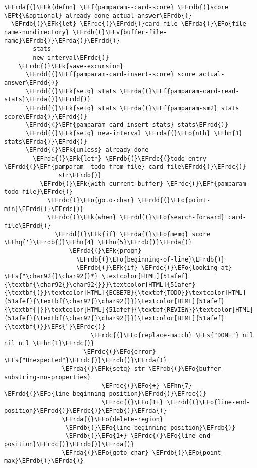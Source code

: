 \documentclass[a4wide,10pt]{article}
\newcommand{\EFs}[1]{\textcolor{EFs}{#1}} %
\newcommand{\EFk}[1]{\textcolor{EFk}{#1}} %
\newcommand{\EFf}[1]{\textcolor{EFf}{#1}} %
\newcommand{\EFv}[1]{\textcolor{EFv}{#1}} %
\newcommand{\EFt}[1]{\textcolor{EFt}{#1}} %
\newcommand{\EFo}[1]{\textcolor{EFo}{#1}} %
\newcommand{\EFhn}[1]{\textcolor{EFhn}{\textbf{#1}}} %
\newcommand{\EFhq}[1]{\textcolor{EFhq}{#1}} %
\newcommand{\EFrda}[1]{\textcolor{EFrda}{#1}} %
\newcommand{\EFrdb}[1]{\textcolor{EFrdb}{#1}} %
\newcommand{\EFrdc}[1]{\textcolor{EFrdc}{#1}} %
\newcommand{\EFrdd}[1]{\textcolor{EFrdd}{#1}} %
\begin{document}
\begin{Code}
\begin{Verbatim}
\EFrda{(}\EFk{defun} \EFf{pamparam--card-score} \EFrdb{(}score \EFt{\&optional} already-done actual-answer\EFrdb{)}
  \EFrdb{(}\EFk{let} \EFrdc{(}\EFrdd{(}card-file \EFrda{(}\EFo{file-name-nondirectory} \EFrdb{(}\EFv{buffer-file-name}\EFrdb{)}\EFrda{)}\EFrdd{)}
        stats
        new-interval\EFrdc{)}
    \EFrdc{(}\EFk{save-excursion}
      \EFrdd{(}\EFf{pamparam-card-insert-score} score actual-answer\EFrdd{)}
      \EFrdd{(}\EFk{setq} stats \EFrda{(}\EFf{pamparam-card-read-stats}\EFrda{)}\EFrdd{)}
      \EFrdd{(}\EFk{setq} stats \EFrda{(}\EFf{pamparam-sm2} stats score\EFrda{)}\EFrdd{)}
      \EFrdd{(}\EFf{pamparam-card-insert-stats} stats\EFrdd{)}
      \EFrdd{(}\EFk{setq} new-interval \EFrda{(}\EFo{nth} \EFhn{1} stats\EFrda{)}\EFrdd{)}
      \EFrdd{(}\EFk{unless} already-done
        \EFrda{(}\EFk{let*} \EFrdb{(}\EFrdc{(}todo-entry \EFrdd{(}\EFf{pamparam--todo-from-file} card-file\EFrdd{)}\EFrdc{)}
               str\EFrdb{)}
          \EFrdb{(}\EFk{with-current-buffer} \EFrdc{(}\EFf{pamparam-todo-file}\EFrdc{)}
            \EFrdc{(}\EFo{goto-char} \EFrdd{(}\EFo{point-min}\EFrdd{)}\EFrdc{)}
            \EFrdc{(}\EFk{when} \EFrdd{(}\EFo{search-forward} card-file\EFrdd{)}
              \EFrdd{(}\EFk{if} \EFrda{(}\EFo{memq} score \EFhq{'}\EFrdb{(}\EFhn{4} \EFhn{5}\EFrdb{)}\EFrda{)}
                  \EFrda{(}\EFk{progn}
                    \EFrdb{(}\EFo{beginning-of-line}\EFrdb{)}
                    \EFrdb{(}\EFk{if} \EFrdc{(}\EFo{looking-at} \EFs{"\char92{}\char92{}*} \textcolor[HTML]{51afef}{\textbf{\char92{}\char92{}}}\textcolor[HTML]{51afef}{\textbf{(}}\textcolor[HTML]{ECBE7B}{\textbf{TODO}}\textcolor[HTML]{51afef}{\textbf{\char92{}\char92{}}}\textcolor[HTML]{51afef}{\textbf{|}}\textcolor[HTML]{51afef}{\textbf{REVIEW}}\textcolor[HTML]{51afef}{\textbf{\char92{}\char92{}}}\textcolor[HTML]{51afef}{\textbf{)}}\EFs{"}\EFrdc{)}
                        \EFrdc{(}\EFo{replace-match} \EFs{"DONE"} nil nil nil \EFhn{1}\EFrdc{)}
                      \EFrdc{(}\EFo{error} \EFs{"Unexpected"}\EFrdc{)}\EFrdb{)}\EFrda{)}
                \EFrda{(}\EFk{setq} str \EFrdb{(}\EFo{buffer-substring-no-properties}
                           \EFrdc{(}\EFo{+} \EFhn{7} \EFrdd{(}\EFo{line-beginning-position}\EFrdd{)}\EFrdc{)}
                           \EFrdc{(}\EFo{1+} \EFrdd{(}\EFo{line-end-position}\EFrdd{)}\EFrdc{)}\EFrdb{)}\EFrda{)}
                \EFrda{(}\EFo{delete-region}
                 \EFrdb{(}\EFo{line-beginning-position}\EFrdb{)}
                 \EFrdb{(}\EFo{1+} \EFrdc{(}\EFo{line-end-position}\EFrdc{)}\EFrdb{)}\EFrda{)}
                \EFrda{(}\EFo{goto-char} \EFrdb{(}\EFo{point-max}\EFrdb{)}\EFrda{)}

\end{Verbatim}
\end{Code}
\end{document}
